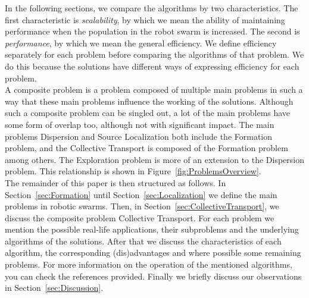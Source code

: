 In the following sections, we compare the algorithms by two characteristics. 
The first characteristic is \emph{scalability}, by which we mean the ability of maintaining performance when the population in the robot swarm is increased. 
The second is \emph{performance}, by which we mean the general efficiency. 
We define efficiency separately for each problem before comparing the algorithms of that problem. 
We do this because the solutions have different ways of expressing efficiency for each problem.\\

A composite problem is a problem composed of multiple main problems in such a way that these main problems influence the working of the solutions. 
Although such a composite problem can be singled out, a lot of the main problems have some form of overlap too, although not with significant impact. 
The main problems Dispersion and Source Localization both include the Formation problem, and the Collective Transport is composed of the Formation problem among others.
The Exploration problem is more of an extension to the Dispersion problem. 
This relationship is shown in Figure~\ref{fig:ProblemsOverview}. \\


The remainder of this paper is then structured as follows. 
In Section~\ref{sec:Formation} until Section~\ref{sec:Localization} we define the main problems in robotic swarms. 
Then, in Section~\ref{sec:CollectiveTransport}, we discuss the composite problem Collective Transport. 
For each problem we mention the possible real-life applications, their subproblems and the underlying algorithms of the solutions.
After that we discuss the characteristics of each algorithm, the corresponding (dis)advantages and where possible some remaining problems.
For more information on the operation of the mentioned algorithms, you can check the references provided. 
Finally we briefly discuss our observations in Section~\ref{sec:Discussion}.



